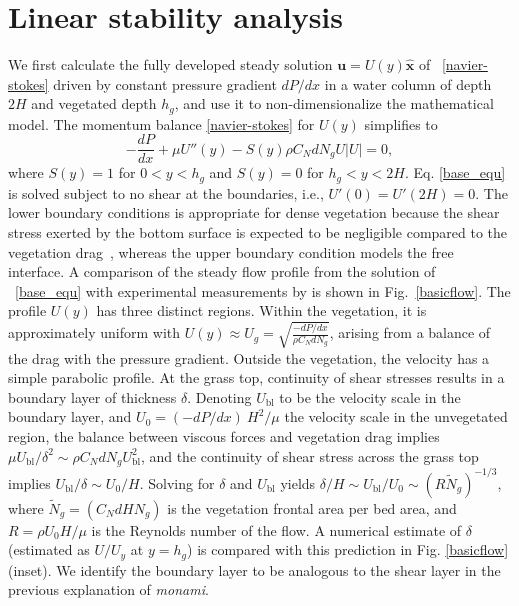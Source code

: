 \documentclass{jfm}
\newcommand{\bu}{\mathbf{u}}
\newcommand{\hg}{h_g}
\renewcommand{\Rey}{{R}}
\newcommand{\Ndg}{\tilde{N}_g}
\newcommand{\monami}{\textit{monami}}
\newcommand{\ubl}{U_\text{bl}}
\newcommand{\ReyNdg}{{\Rey\Ndg}}
\begin{document}
\section{Linear stability analysis}
We first calculate the fully developed steady solution $\bu = U(y)\boldsymbol{\hat{x}}$ of ~\eqref{navier-stokes} driven by constant pressure gradient $dP/dx$ in a water column of depth $2H$ and vegetated depth $\hg$, and use it to non-dimensionalize the mathematical model. The momentum balance \eqref{navier-stokes} for $U(y)$ simplifies to
\begin{equation}
 -\frac{dP}{dx}+\mu U''(y) -S(y) \rho C_N d N_gU |U|=0,
\label{base_equ}
\end{equation}
where $S(y)=1$ for $0<y<\hg$ and $S(y)=0$ for $\hg< y< 2H$. 
Eq. \eqref{base_equ} is solved subject to no shear at the boundaries, i.e., $U'(0) = U'(2H) = 0$.
The lower boundary conditions is appropriate for dense vegetation because the shear stress exerted by the bottom surface is expected to be negligible compared to the vegetation drag~\citep{Nepf00}, whereas the upper boundary condition models the free interface. 
A comparison of the steady flow profile from the solution of ~\eqref{base_equ} with experimental measurements by \cite{Nepf04} is shown in Fig.~\ref{basicflow}.
The profile $U(y)$ has three distinct regions.
Within the vegetation, it is approximately uniform with $ U(y) \approx U_g = \sqrt{\frac{-dP/dx}{\rho C_N dN_g}}$, arising from a balance of the drag with the pressure gradient. 
Outside the vegetation, the velocity has a simple parabolic profile. %
At the grass top, continuity of shear stresses results in a boundary layer of thickness $\delta$. 
Denoting $\ubl$ to be the velocity scale in the boundary layer, and $U_0 = {(-dP/dx)~H^2}/{\mu}$ the velocity scale in the unvegetated region, the balance between viscous forces and vegetation drag implies $\mu \ubl/\delta^2 \sim \rho C_N d N_g \ubl^2$, and the continuity of shear stress across the grass top implies $\ubl/\delta \sim U_0/H$.
Solving for $\delta$ and $\ubl$ yields $\delta/H \sim \ubl/U_0 \sim (\ReyNdg)^{-1/3}$, where $\Ndg = \left(C_N d H N_g\right)$ is the vegetation frontal area per bed area, and $\Rey=\rho U_0 H/\mu$ is the Reynolds number of the flow. 
A numerical estimate of $\delta$ (estimated as $U/U_y$ at $y=\hg$) is compared with this prediction in Fig. \ref{basicflow} (inset).
We identify the boundary layer to be analogous to the shear layer \citep{Ghisal02,Nepf04} in the previous explanation of \monami.
\end{document}
